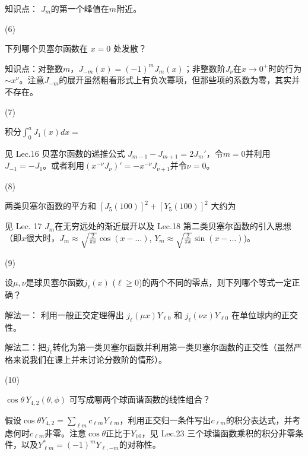\documentclass[12pt,CJK]{article}
\begin{document}
{{{\red 知识点： $J_m$的第一个峰值在$m$附近。}
}
  
\item[(6)]{ 下列哪个贝塞尔函数在 $x=0$ 处发散？ 
  

{\red 知识点：对整数$m$，$J_{-m}(x) = (-1)^mJ_m(x)$；非整数阶$J_\nu$在$x\rightarrow 0^+$时的行为$\sim x^\nu$。注意$J_{-m}$的展开虽然粗看形式上有负次幂项，但那些项的系数为零，其实并不存在。}
}

\item[(7)]{ 积分$\int_0^a J_1(x) dx= $ 
  

  {\red 见 Lec.16 贝塞尔函数的递推公式 $J_{m-1}-J_{m+1} = 2 J_{m}' $，令$m=0$并利用$J_{-1} = -J_1$。或者利用$(x^{-\nu} J_\nu)' = -x^{-\nu} J_{\nu +1}$并令$\nu=0$。 }
}

\item[(8)]{两类贝塞尔函数的平方和 $[J_{5}(100)]^2+[Y_{5}(100)]^2$ 大约为 


{\red 见 Lec. 17 $J_m$在无穷远处的渐近展开以及 Lec.18 第二类贝塞尔函数的引入思想（即$x$很大时，$J_m\approx \sqrt{\frac{2}{\pi x}}\cos(x-\ldots)$, $Y_m\approx \sqrt{\frac{2}{\pi x}}\sin(x-\ldots)$)。}
}  

\item[(9)]{设$\mu, \nu$是球贝塞尔函数$j_\ell(x)$ ($\ell\ge 0$)的两个不同的零点，则下列哪个等式一定正确？ 
  

  {\red 解法一： 利用一般正交定理得出 $j_\ell(\mu x)Y_{\ell 0}$ 和 $j_\ell(\nu x)Y_{\ell 0}$ 在单位球内的正交性。

  解法二：把$j_\ell$转化为第一类贝塞尔函数并利用第一类贝塞尔函数的正交性（虽然严格来说我们在课上并未讨论分数阶的情形）。}
}
  
\item[(10)]{$\cos\theta\, Y_{4,2}(\theta,\phi)$ 可写成哪两个球面谐函数的线性组合？ 
  

{\red  假设$\cos\theta Y_{4,2} = \sum_{\ell m} c_{\ell m}Y_{\ell m}$，利用正交归一条件写出$c_{\ell m}$的积分表达式，并考虑何时$c_{\ell m}$非零。注意$\cos\theta$正比于$Y_{10}$，见 Lec.23 三个球谐函数乘积的积分非零条件，以及$Y_{\ell m}^* = (-1)^m Y_{\ell,- m}$的对称性。}
}  

\eitem  
}
\end{document}
